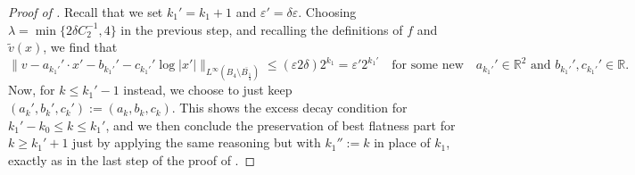 \documentclass{article}
\newcommand{\R}{\mathbb{R}}
\newcommand{\ep}{\varepsilon}
\theoremstyle{definition}
\begin{document}
\begin{proof}[Proof of ]
Recall that we set $k_1'=k_1+1$ and $\ep'=\delta \ep$. Choosing $\lambda=\min\{2\delta C_2^{-1},4\}$ in the previous step, and recalling the definitions of $f$ and $\widetilde v(x)$, we find that
\begin{equation*}
    \|v- a_{k_1'}'\cdot x'- b_{k_1'}' - c_{k_1'}'\log|x'|\|_{L^\infty(B_{4}\setminus \overline{B_{\frac{1}{4}}})
}\leq (\ep 2\delta)2^{k_1}=\ep'2^{k_1'} \quad\mbox{for some new}\quad a_{k_1'}'\in\R^{2}\mbox{ and }b_{k_1'}', c_{k_1'}'\in\R.
\end{equation*}
Now, for $k\leq k_1'-1$ instead, we choose to just keep $(a_k',b_k',c_k'):=(a_k,b_k,c_k)$. This shows the excess decay condition for $k_1'-k_0\leq k \leq k_1'$, and we then conclude the preservation of best flatness part for $k\geq k_1'+1$ just by applying the same reasoning but with $k_1'':=k$ in place of $k_1$, exactly as in the last step of the proof of .
\end{proof}



\printbibliography
\end{document}
